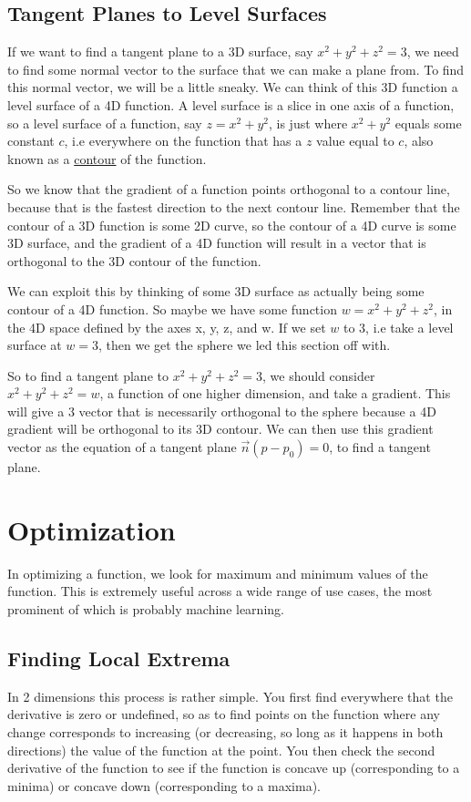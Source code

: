 \documentclass[12pt, letterpaper]{article}
\begin{document}
\subsection{Tangent Planes to Level Surfaces}
If we want to find a tangent plane to a 3D surface, say $x^2 + y^2 + z^2 = 3$, we need to find some normal vector to the surface that we can make a plane from. To find this normal vector, we will be a little sneaky. We can think of this 3D function a level surface of a 4D function. A level surface is a slice in one axis of a function, so a level surface of a function, say $z = x^2 + y^2$, is just where $x^2 + y^2$ equals some constant $c$, i.e everywhere on the function that has a $z$ value equal to $c$, also known as a \hyperref[sssec:Contour Maps]{contour} of the function.

So we know that the gradient of a function points orthogonal to a contour line, because that is the fastest direction to the next contour line. Remember that the contour of a 3D function is some 2D curve, so the contour of a 4D curve is some 3D surface, and the gradient of a 4D function will result in a vector that is orthogonal to the 3D contour of the function. 

We can exploit this by thinking of some 3D surface as actually being some contour of a 4D function. So maybe we have some function $w = x^2 + y^2 + z^2$, in the 4D space defined by the axes x, y, z, and w. If we set $w$ to $3$, i.e take a level surface at $w=3$, then we get the sphere we led this section off with.

So to find a tangent plane to $x^2 + y^2 + z^2 = 3$, we should consider $x^2 + y^2 + z^2 = w$, a function of one higher dimension, and take a gradient. This will give a 3 vector that is necessarily orthogonal to the sphere because a 4D gradient will be orthogonal to its 3D contour. We can then use this gradient vector as the equation of a tangent plane $\vec{n}(p - p_0) = 0$, to find a tangent plane.

\section{Optimization}

In optimizing a function, we look for maximum and minimum values of the function. This is extremely useful across a wide range of use cases, the most prominent of which is probably machine learning.

\subsection{Finding Local Extrema}
In 2 dimensions this process is rather simple. You first find everywhere that the derivative is zero or undefined, so as to find points on the function where any change corresponds to increasing (or decreasing, so long as it happens in both directions) the value of the function at the point. You then check the second derivative of the function to see if the function is concave up (corresponding to a minima) or concave down (corresponding to a maxima).
\end{document}
